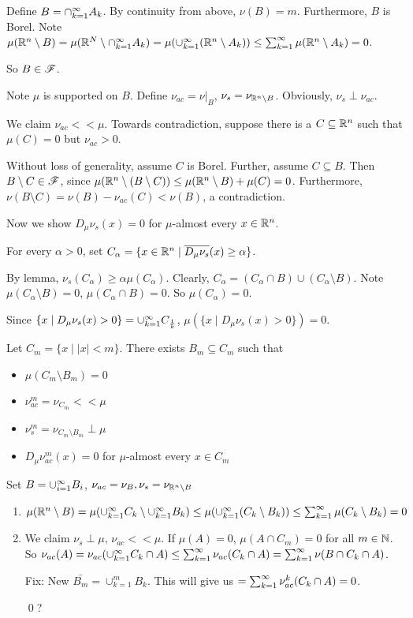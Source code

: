 \documentclass[x11names,reqno,14pt]{extarticle}
\newcommand{\seq}[2][\oo]{_{#2 = 1}^#1}
\newcommand{\cupk}[1][\oo]{\cup\seq[#1]{k}}
\newcommand{\cupi}[1][\oo]{\cup\seq[#1]{i}}
\newcommand{\capk}[1][\oo]{\cap\seq[#1]{k}}
\newcommand{\Dmn}{D_\mu\nu}
\begin{document}
Define $B = \capk A_k$. By continuity from above, $\nu(B) = m$. Furthermore, $B$ is Borel. Note $\mu(\R^n\setminus B) = \mu(\R^N\setminus \capk A_k) = \mu(\cupk(\R^n\setminus A_k)) \leq \sum\seq{k}\mu(\R^n\setminus A_k) = 0$. 

So $B \in \mathscr{F}$.

Note $\mu$ is supported on $B$. Define $\nu_{ac} = \nu|_B$, $\nu_s = \nu_{\mathbb{R}^n\setminus B}$. Obviously, $\nu_s\perp\nu_{ac}$. 

We claim $\nu_{ac}<<\mu$. Towards contradiction, suppose there is a $C \subseteq\mathbb{R}^n$ such that $\mu(C) = 0$ but $\nu_{ac}>0$.

Without loss of generality, assume $C$ is Borel. Further, assume $C\subseteq B$. Then $B \setminus C \in \mathscr{F}$, since $\mu(\mathbb{R}^n\setminus(B\setminus C)) \leq \mu(\mathbb{R}^n\setminus B) + \mu(C) = 0$. Furthermore, $\nu(B\setminus C) = \nu(B) - \nu_{ac}(C) < \nu(B)$, a contradiction.

Now we show $\Dmn_s(x) = 0$ for $\mu$-almost every $x \in \mathbb{R}^n$. 

For every $\alpha>0$, set $C_\alpha = \{x\in\R^n\mid \bar{\Dmn_s}(x) \geq\alpha\}$.

By lemma, $\nu_s(C_\alpha) \geq \alpha\mu(C_\alpha)$. Clearly, $C_\alpha = (C_\alpha \cap B) \cup (C_\alpha \setminus B)$. Note $\mu(C_\alpha\setminus B) = 0$, $\mu(C_\alpha \cap B) = 0$. So $\mu(C_\alpha) = 0$. 

Since $\{x\mid \Dmn_s(x) > 0\} = \cupk C_{\frac{1}{k}}$, $\mu(\{x\mid \Dmn_s(x)>0\}) = 0$.

Let $C_m = \{x\mid|x|<m\}$. There exists $B_m\subseteq C_m$ such that
\begin{itemize}
\item $\mu(C_m\setminus B_m) = 0$
\item $\nu_{ac}^m = \nu_{C_m} < < \mu$
\item $\nu_s^m = \nu_{C_m\setminus B_m}\perp\mu$
\item $\Dmn_{ac}^m(x) = 0$ for $\mu$-almost every $x \in C_m$
\end{itemize}
Set $B = \cupi B_i$, $\nu_{ac} = \nu_B, \nu_s = \nu_{\mathbb{R}^n\setminus B}$

\begin{enumerate}

\item $\mu(\R^n\setminus B) = \mu(\cupk C_k \setminus \cupk B_k) \leq \mu(\cupk(C_k\setminus B_k)) \leq \sum\seq{k}\mu(C_k\setminus B_k) = 0$

\item We claim $\nu_s\perp\mu$, $\nu_{ac}<<\mu$. If $\mu(A) = 0$, $\mu(A \cap C_m) = 0$ for all $m\in\mathbb{N}$. So $\nu_{ac}(A) = \nu_{ac}(\cupk C_k \cap A) \leq \sum\seq{k}\nu_{ac}(C_k\cap A) = \sum\seq{k}\nu(B\cap C_k \cap A)$.

Fix: New $\bar{B_m} = \cupk[m]B_k$. This will give us $ = \sum\seq{k}\nu_{ac}^k(C_k \cap A) = 0$.

\qed ?

\end{enumerate}
\end{document}
